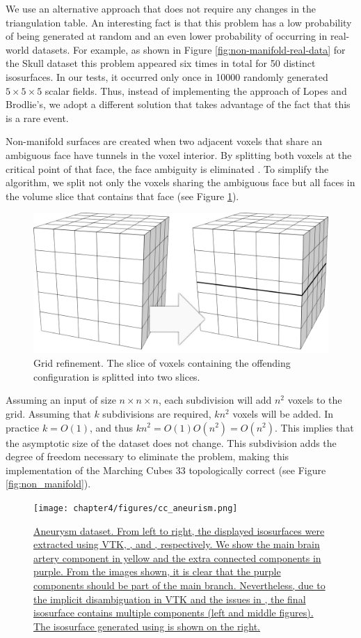 We use an alternative approach that does not require any changes in the \mc{} triangulation table. An interesting fact is that this problem has a low probability of being generated at random and an even lower probability of occurring in real-world datasets. For example, as shown in Figure \ref{fig:non-manifold-real-data} for the Skull dataset this problem appeared six times in total for 50 distinct isosurfaces. In our tests, it occurred only once in 10000 randomly generated $5\times5\times5$ scalar fields. Thus, instead of implementing the approach of Lopes and Brodlie's, we adopt a different solution that takes advantage of the fact that this is a rare event.

Non-manifold surfaces are created when two adjacent voxels that share an ambiguous face have tunnels in the voxel interior. By splitting both voxels at the critical point of that face, the face ambiguity is  eliminated \cite{10.1109/TVCG.2009.10}.
To simplify the algorithm, we split not only the voxels sharing the ambiguous face but all faces in the volume slice that contains that face (see Figure \ref{fig:grid-refinement}). 
%
\begin{figure}[b]
     \centering
	\includegraphics[width=0.5\linewidth]{chapter4/figures/grid.png}
	\caption{\label{fig:grid-refinement}Grid refinement. The slice of voxels containing the offending configuration is splitted into two slices.}
\end{figure}
%
Assuming an input of size $n \times n \times n$, each subdivision will add $n^2$ voxels to the grid.  Assuming that $k$ subdivisions are required, $k n^2$ voxels will be added. In practice $k = O(1)$, and thus $k n^2 = O(1 )O(n^2) = O(n^2)$. This implies that the asymptotic size of the dataset does not change. This subdivision adds the degree of freedom necessary to eliminate the problem, making this implementation of the Marching Cubes 33 topologically correct (see Figure \ref{fig:non_manifold}). 

\begin{figure}[b]
     \centering
     \texttt{[image: chapter4/figures/cc\_aneurism.png]}
     \caption{\href{http://liscustodio.github.io/C_MC33/figure12.html}{Aneurysm dataset. From left to right, the displayed isosurfaces were extracted using VTK, \mc, and \cmc, respectively. We show the main brain artery component in yellow and the extra connected components in purple. From the images shown, it is clear that the purple components should be part of the main branch. Nevertheless, due to the implicit disambiguation in VTK and the issues in \mc, the final isosurface contains multiple components (left and middle figures). The isosurface generated using \cmc{} is shown on the right. } \cite{lisOnline2013}}
     \label{fig:cc_aneurism}
\end{figure}

